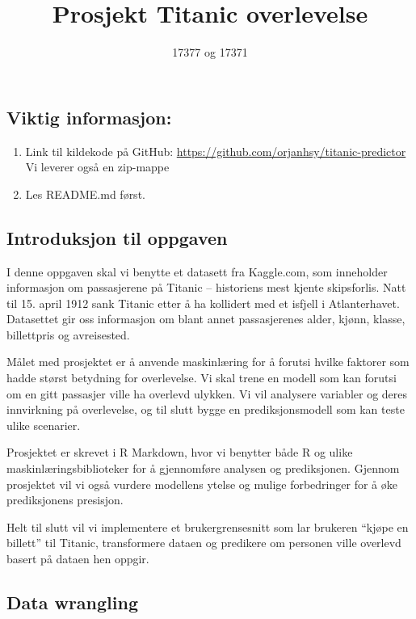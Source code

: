 \documentclass[
]{article}
\title{Prosjekt Titanic overlevelse}
\author{17377 og 17371}
\date{}
\providecommand{\tightlist}{%
  \setlength{\itemsep}{0pt}\setlength{\parskip}{0pt}}
\begin{document}
\maketitle

\subsection{Viktig informasjon:}\label{viktig-informasjon}

\begin{enumerate}
\def\labelenumi{\arabic{enumi}.}
\tightlist
\item
  Link til kildekode på GitHub:
  \url{https://github.com/orjanhsy/titanic-predictor} Vi leverer også en
  zip-mappe
\item
  Les README.md først.
\end{enumerate}

\subsection{Introduksjon til oppgaven}\label{introduksjon-til-oppgaven}

I denne oppgaven skal vi benytte et datasett fra Kaggle.com, som
inneholder informasjon om passasjerene på Titanic -- historiens mest
kjente skipsforlis. Natt til 15. april 1912 sank Titanic etter å ha
kollidert med et isfjell i Atlanterhavet. Datasettet gir oss informasjon
om blant annet passasjerenes alder, kjønn, klasse, billettpris og
avreisested.

Målet med prosjektet er å anvende maskinlæring for å forutsi hvilke
faktorer som hadde størst betydning for overlevelse. Vi skal trene en
modell som kan forutsi om en gitt passasjer ville ha overlevd ulykken.
Vi vil analysere variabler og deres innvirkning på overlevelse, og til
slutt bygge en prediksjonsmodell som kan teste ulike scenarier.

Prosjektet er skrevet i R Markdown, hvor vi benytter både R og ulike
maskinlæringsbiblioteker for å gjennomføre analysen og prediksjonen.
Gjennom prosjektet vil vi også vurdere modellens ytelse og mulige
forbedringer for å øke prediksjonens presisjon.

Helt til slutt vil vi implementere et brukergrensesnitt som lar brukeren
``kjøpe en billett'' til Titanic, transformere dataen og predikere om
personen ville overlevd basert på dataen hen oppgir.

\subsection{Data wrangling}\label{data-wrangling}
\end{document}
